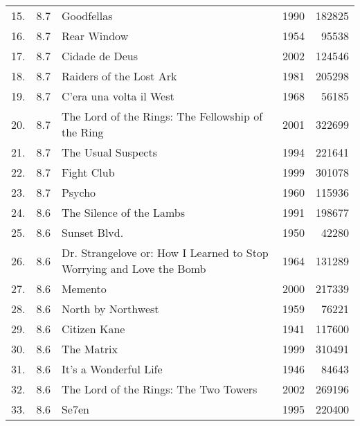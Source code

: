 {\begin{longtable}[c]{lrXrr}
15. & 8.7 & Goodfellas                                                           & 1990 & 182825 \\
16. & 8.7 & Rear Window                                                          & 1954 & 95538  \\
17. & 8.7 & Cidade de Deus                                                       & 2002 & 124546 \\
18. & 8.7 & Raiders of the Lost Ark                                              & 1981 & 205298 \\
19. & 8.7 & C'era una volta il West                                              & 1968 & 56185  \\
20. & 8.7 & The Lord of the Rings: The Fellowship of the Ring                    & 2001 & 322699 \\
21. & 8.7 & The Usual Suspects                                                   & 1994 & 221641 \\
22. & 8.7 & Fight Club                                                           & 1999 & 301078 \\
23. & 8.7 & Psycho                                                               & 1960 & 115936 \\
24. & 8.6 & The Silence of the Lambs                                             & 1991 & 198677 \\
25. & 8.6 & Sunset Blvd.                                                         & 1950 & 42280  \\
26. & 8.6 & Dr. Strangelove or: How I Learned to Stop Worrying and Love the Bomb & 1964 & 131289 \\
27. & 8.6 & Memento                                                              & 2000 & 217339 \\
28. & 8.6 & North by Northwest                                                   & 1959 & 76221  \\
29. & 8.6 & Citizen Kane                                                         & 1941 & 117600 \\
30. & 8.6 & The Matrix                                                           & 1999 & 310491 \\
31. & 8.6 & It's a Wonderful Life                                                & 1946 & 84643  \\
32. & 8.6 & The Lord of the Rings: The Two Towers                                & 2002 & 269196 \\
33. & 8.6 & Se7en                                                                & 1995 & 220400 \\

\end{longtable}}
